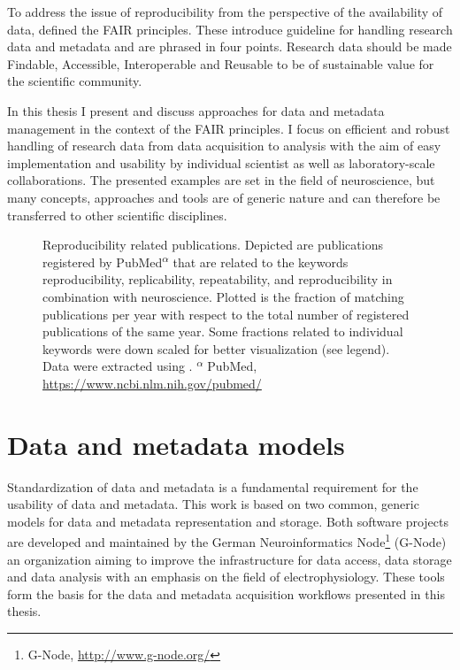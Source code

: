 To address the issue of reproducibility from the perspective of the availability of data, \citet{Wilkinson_2016} defined the FAIR principles. These introduce guideline for handling research data and metadata and are phrased in four points. Research data should be made Findable, Accessible, Interoperable and Reusable to be of sustainable value for the scientific community.

In this thesis I present and discuss approaches for data and metadata management in the context of the FAIR principles. I focus on efficient and robust handling of research data from data acquisition to analysis with the aim of easy implementation and usability by individual scientist as well as laboratory-scale collaborations. The presented examples are set in the field of neuroscience, but many concepts, approaches and tools are of generic nature and can therefore be transferred to other scientific disciplines. 


\begin{figure}
 \centering
 
 \caption[Reproducibility related publications]{Reproducibility related publications. Depicted  are publications registered by PubMed\textsuperscript{$\alpha$} that are related to the keywords reproducibility, replicability, repeatability, and reproducibility in combination with neuroscience. Plotted is the fraction of matching publications per year with respect to the total number of registered publications of the same year. Some fractions related to individual keywords were down scaled for better visualization (see legend). Data were extracted using \citet{Corlan_2004}. \small\textsuperscript{$\alpha$} PubMed, \url{https://www.ncbi.nlm.nih.gov/pubmed/}}
 \label{fig:intro_reproducibility}
\end{figure}

\section{Data and metadata models}
Standardization of data and metadata is a fundamental requirement for the usability of data and metadata. This work is based on two common, generic models for data and metadata representation and storage. Both software projects are developed and maintained by the German Neuroinformatics Node\footnote{G-Node, \url{http://www.g-node.org/}} (G-Node) an organization aiming to improve the infrastructure for data access, data storage and data analysis with an emphasis on the field of electrophysiology. These tools form the basis for the data and metadata acquisition workflows presented in this thesis.

